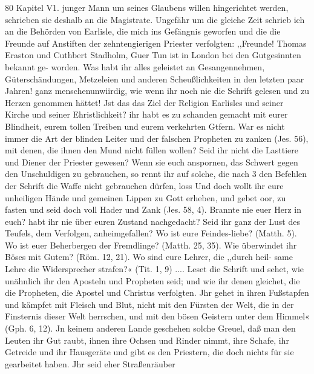 
80 Kapitel V1.
junger Mann um seines Glaubens willen hingerichtet werden,
schrieben sie deshalb an die Magistrate.
Ungefähr um die gleiche Zeit schrieb ich an die Behörden
von Earlisle, die mich ins Gefängnis geworfen und die die
Freunde auf Anstiften der zehntengierigen Priester verfolgten:
,,Freunde! Thomas Eraston und Cuthbert Stadholm,
Guer Tun ist in London bei den Gutgesinnten bekannt ge-
worden. Was habt ihr alles geleistet an Gesangennehmen,
Güterschändungen, Metzeleien und anderen Scheußlichkeiten in den
letzten paar Jahren! ganz menschenunwiirdig, wie wenn ihr
noch nie die Schrift gelesen und zu Herzen genommen hättet!
Jst das das Ziel der Religion Earlisles und seiner Kirche und
seiner Ehristlichkeit? ihr habt es zu schanden gemacht mit eurer
Blindheit, eurem tollen Treiben und eurem verkehrten Gtfern.
War es nicht immer die Art der blinden Leiter und der falschen
Propheten zu zanken (Jes. 56), mit denen, die ihnen den Mund
nicht füllen wollen? Seid ihr nicht die Lasttiere und Diener der
Priester gewesen? Wenn sie euch anspornen, das Schwert gegen
den Unschuldigen zu gebrauchen, so rennt ihr auf solche, die nach 3
den Befehlen der Schrift die Waffe nicht gebrauchen dürfen, loss
Und doch wollt ihr eure unheiligen Hände und gemeinen Lippen
zu Gott erheben, und gebet oor, zu fasten und seid doch voll
Hader und Zank (Jes. 58, 4). Brannte nie euer Herz in euch?
habt ihr nie über euren Zustand nachgedacht? Seid ihr ganz
der Lust des Teufels, dem Verfolgen, anheimgefallen? Wo ist
eure Feindes-liebe? (Matth. 5). Wo ist euer Beherbergen der
Fremdlinge? (Matth. 25, 35). Wie überwindet ihr Böses mit
Gutem? (Röm. 12, 21). Wo sind eure Lehrer, die ,,durch heil-
same Lehre die Widersprecher strafen?« (Tit. 1, 9) .... Leset die
Schrift und sehet, wie unähnlich ihr den Aposteln und Propheten
seid; und wie ihr denen gleichet, die die Propheten, die Apostel
und Christus verfolgten. Jhr gehet in ihren Fußstapfen und
kämpfet mit Fleisch und Blut, nicht mit den Fürsten der Welt,
die in der Finsternis dieser Welt herrschen, und mit den bösen
Geistern unter dem Himmel« (Gph. 6, 12). Jn keinem anderen
Lande geschehen solche Greuel, daß man den Leuten ihr Gut
raubt, ihnen ihre Ochsen und Rinder nimmt, ihre Schafe, ihr
Getreide und ihr Hausgeräte und gibt es den Priestern, die doch
nichts für sie gearbeitet haben. Jhr seid eher Straßenräuber



